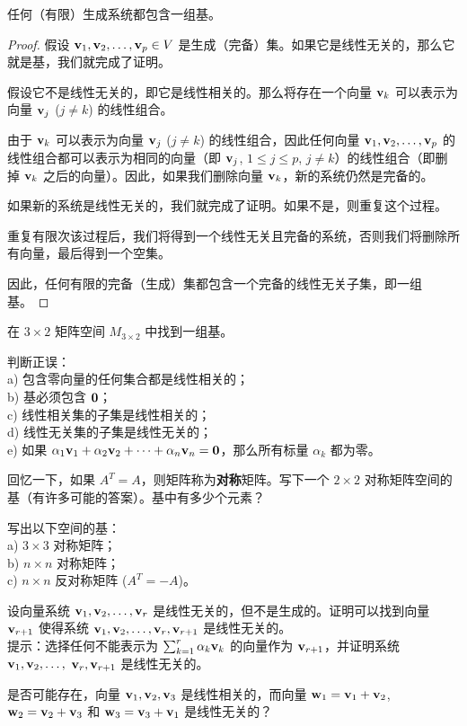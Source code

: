 \begin{proposition}\label{stmt:01-02-08}
任何（有限）生成系统都包含一组基。
\end{proposition}

\begin{proof}
假设 $\mathbf{v}_1, \mathbf{v}_2, \dots, \mathbf{v}_p \in V$ 是生成（完备）集。如果它是线性无关的，那么它就是基，我们就完成了证明。

假设它不是线性无关的，即它是线性相关的。那么将存在一个向量 $\mathbf{v}_k$ 可以表示为向量 $\mathbf{v}_j$ ($j \neq k$) 的线性组合。

由于 $\mathbf{v}_k$ 可以表示为向量 $\mathbf{v}_j$ ($j \neq k$) 的线性组合，因此任何向量 $\mathbf{v}_1, \mathbf{v}_2, \dots, \mathbf{v}_p$ 的线性组合都可以表示为相同的向量（即 $\mathbf{v}_j$, $1 \le j \le p$, $j \neq k$）的线性组合（即删掉 $\mathbf{v}_k$ 之后的向量）。因此，如果我们删除向量 $\mathbf{v}_k$，新的系统仍然是完备的。

如果新的系统是线性无关的，我们就完成了证明。如果不是，则重复这个过程。

重复有限次该过程后，我们将得到一个线性无关且完备的系统，否则我们将删除所有向量，最后得到一个空集。

因此，任何有限的完备（生成）集都包含一个完备的线性无关子集，即一组基。\end{proof}



\begin{problemset}
\item \label{ex:01-02-01} 在 $3 \times 2$ 矩阵空间 $M_{3 \times 2}$ 中找到一组基。
\item \label{ex:01-02-02} 判断正误：
\\
a) 包含零向量的任何集合都是线性相关的；
\\
b) 基必须包含 $\mathbf{0}$；
\\
c) 线性相关集的子集是线性相关的；
\\
d) 线性无关集的子集是线性无关的；
\\
e) 如果 $\alpha_1 \mathbf{v}_1 + \alpha_2 \mathbf{v}_2 + \dots + \alpha_n \mathbf{v}_n = \mathbf{0}$，那么所有标量 $\alpha_k$ 都为零。
\item \label{ex:01-02-03} 回忆一下，如果 $A^T = A$，则矩阵称为\textbf{对称}矩阵。写下一个 $2 \times 2$ 对称矩阵空间的基（有许多可能的答案）。基中有多少个元素？
\item \label{ex:01-02-04} 写出以下空间的基：
\\
a) $3 \times 3$ 对称矩阵；
\\
b) $n \times n$ 对称矩阵；
\\
c) $n \times n$ 反对称矩阵 ($A^T = -A$)。
\item \label{ex:01-02-05} 设向量系统 $\mathbf{v}_1, \mathbf{v}_2, \dots, \mathbf{v}_r$ 是线性无关的，但不是生成的。证明可以找到向量 $\mathbf{v}_{r+1}$ 使得系统 $\mathbf{v}_1, \mathbf{v}_2, \dots, \mathbf{v}_r, \mathbf{v}_{r+1}$ 是线性无关的。
\\
提示：选择任何不能表示为 $\sum_{k=1}^r \alpha_k \mathbf{v}_k$ 的向量作为 $\mathbf{v}_{r+1}$，并证明系统 $\mathbf{v}_1, \mathbf{v}_2, \dots, $ $\mathbf{v}_r, \mathbf{v}_{r+1}$ 是线性无关的。
\item \label{ex:01-02-06} 是否可能存在，向量 $\mathbf{v}_1, \mathbf{v}_2, \mathbf{v}_3$ 是线性相关的，而向量 $\mathbf{w}_1 = \mathbf{v}_1 + \mathbf{v}_2$, $\mathbf{w}_2 = \mathbf{v}_2 + \mathbf{v}_3$ 和 $\mathbf{w}_3 = \mathbf{v}_3 + \mathbf{v}_1$ 是线性无关的？


\end{problemset}

